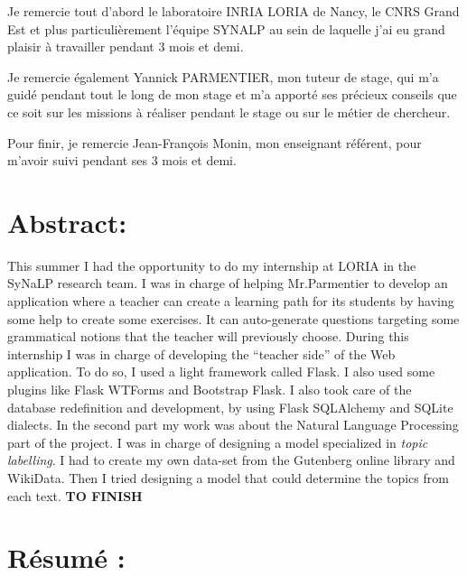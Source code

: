 \documentclass[12pt]{article}
\begin{document}
Je remercie tout d'abord le laboratoire INRIA LORIA de Nancy, le CNRS Grand Est et plus particulièrement l'équipe SYNALP au sein de laquelle j'ai eu grand plaisir à travailler pendant 3 mois et demi. 

Je remercie également Yannick PARMENTIER, mon tuteur de stage, qui m’a guidé pendant tout le long de mon stage et m’a apporté ses précieux conseils que ce soit sur les missions à réaliser pendant le stage ou sur le métier de chercheur. 

Pour finir, je remercie Jean-François Monin, mon enseignant référent, pour m’avoir suivi pendant ses 3 mois et demi. 


\newpage

\section*{Abstract:}

This summer I had the opportunity to do my internship at LORIA in the SyNaLP research team. I was in charge of helping Mr.Parmentier to develop an application where a teacher can create a learning path for its students by having some help to create some exercises. It can auto-generate questions targeting some grammatical notions that the teacher will previously choose. 
During this internship I was in charge of developing the “teacher side” of the Web application. To do so, I used a light framework called Flask. I also used some plugins like Flask WTForms and Bootstrap Flask. I also took care of the database redefinition and development, by using Flask SQLAlchemy and SQLite dialects.  
In the second part my work was about the Natural Language Processing part of the project. I was in charge of designing a model specialized in \textit{topic labelling}. I had to create my own data-set from the Gutenberg online library and WikiData. Then I tried designing a model that could determine the topics from each text. \textbf{TO FINISH}

\section*{Résumé : }
\end{document}

